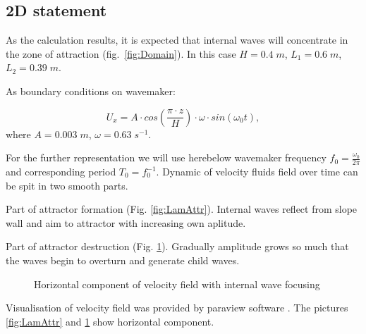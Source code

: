 \documentclass[a4wide,fontsize=12pt]{article}
\begin{document}
\subsection{2D statement}

As the calculation results, it is expected that internal waves will concentrate in the zone of attraction (fig.~\ref{fig:Domain}). In this case $H = 0.4 \; m$, $L_1=0.6 \; m$, $L_2 = 0.39 \; m$.

As boundary conditions on wavemaker:

\begin{equation}
    U_x = A\cdot cos\left(\frac{\pi \cdot z}{H}\right)\cdot \omega \cdot  sin(\omega_0 t),
    \label{eq:wmc}
\end{equation}
where $A = 0.003 \; m$, $\omega = 0.63 \; s^{-1}$.

For the further representation we will use herebelow wavemaker frequency $f_0=\tfrac{\omega_0}{2\pi}$ and corresponding period $T_0=f_0^{-1}$. 
Dynamic of velocity fluids field over time can be spit in two smooth parts.

Part of attractor formation (Fig. \ref{fig:LamAttr}). Internal waves reflect from slope wall and aim to attractor with increasing own aplitude.

Part of attractor destruction (Fig. \ref{fig:turbAttr}). Gradually amplitude grows so much that the waves begin to overturn and generate child waves.

\begin{figure}
\centering
    \begin{minipage}{0.45\textwidth}
        \centering
        \label{fig:LamAttr}
    \end{minipage}
    \begin{minipage}{0.45\textwidth}
        \centering
        \label{fig:turbAttr}
    \end{minipage}
    \caption{Horizontal component of velocity field with internal wave focusing}
\end{figure}


Visualisation of velocity field was provided by paraview software \cite{paraview}. The pictures \ref{fig:LamAttr} and \ref{fig:turbAttr} show horizontal component.
\end{document}
